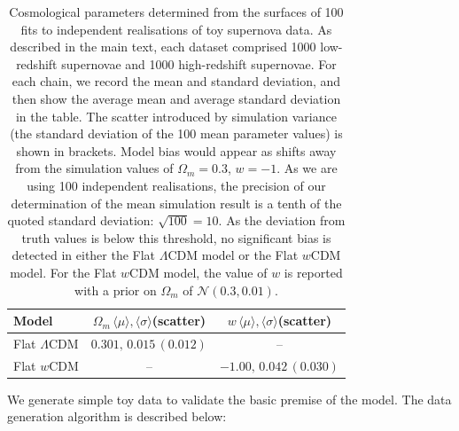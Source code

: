 \documentclass[a4paper,fleqn,usenatbib]{emulateapj}
\begin{document}
\begin{table}
	\centering
	\caption{Cosmological parameters determined from the surfaces of 100 fits to independent realisations of toy supernova data. As described in the main text, each dataset comprised 1000 low-redshift supernovae and 1000 high-redshift supernovae. For each chain, we record the mean and standard deviation, and then show the average mean and average standard deviation in the table. The scatter introduced by simulation variance (the standard deviation of the 100 mean parameter values) is shown in brackets. Model bias would appear as shifts away from the simulation values of $\Omega_m = 0.3$, $w = -1$. As we are using 100 independent realisations, the precision of our determination of the mean simulation result is a tenth of the quoted standard deviation: $\sqrt{100} = 10$. As the deviation from truth values is below this threshold, no significant bias is detected in either the Flat $\Lambda$CDM model or the Flat $w$CDM model. For the Flat $w$CDM model, the value of $w$ is reported with a prior on $\Omega_m$ of $\mathcal{N}(0.3, 0.01)$.}
	\label{tab:simple_model}
	\begin{tabular}{l|cc}
		\hline
		Model & $\Omega_m\, \langle\mu\rangle,\langle\sigma\rangle$(scatter) & $w\, \langle\mu\rangle,\langle\sigma\rangle$(scatter) \\ 
		\hline
		Flat $\Lambda$CDM & $0.301,\, 0.015\,(0.012)$ & -- \\ 
		Flat $w$CDM & -- & $-1.00,\, 0.042\,(0.030)$ \\ 
		\hline
	\end{tabular}
\end{table}

We generate simple toy data to validate the basic premise of the model. The data generation algorithm is described below:
\end{document}
